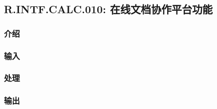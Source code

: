 \subsection{R.INTF.CALC.010: 在线文档协作平台功能}
\subsubsection{介绍}
\subsubsection{输入}
\subsubsection{处理}
\subsubsection{输出}